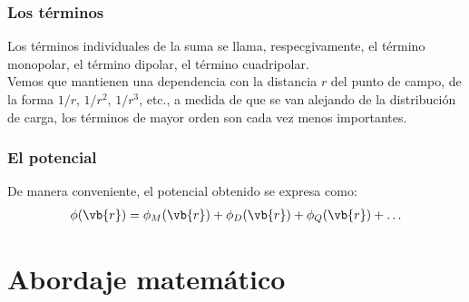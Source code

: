 \begin{frame}
\frametitle{Los términos}
Los términos individuales de la suma se llama, respecgivamente, el término monopolar, el término dipolar, el término cuadripolar.
\\
\bigskip
\pause
Vemos que mantienen una dependencia con la distancia $r$ del punto de campo, de la forma $1/r$, $1/r^{2}$, $1/r^{3}$, etc., a medida de que se van alejando de la distribución de carga, los términos de mayor orden son cada vez menos importantes.
\end{frame}
\begin{frame}
\frametitle{El potencial}
De manera conveniente, el potencial obtenido se expresa como:
\begin{align}
\phi(\vb{r}) = \phi_{M}(\vb{r}) + \phi_{D}(\vb{r}) + \phi_{Q}(\vb{r}) + \ldots
\label{eq:ecuacion_08_08}
\end{align}
\end{frame}
\section{Abordaje matemático}
